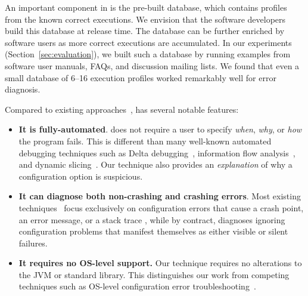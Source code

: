 

An important component in \ourtool is the pre-built
database, which contains profiles
from the known correct executions. We envision that 
the software developers build this database at release time.
The database can be
further enriched by software users as more correct
executions are accumulated. 
In our experiments (Section~\ref{sec:evaluation}), we
built such a database by running examples from software
user manuals, FAQs, and discussion mailing lists.  We
found that even a small database of 6--16 execution profiles worked remarkably
well for error diagnosis.

Compared to existing approaches~\cite{Zeller:2002:ICC, Zhang:2003:PDS,
Rabkin:2011:PPC, Whitaker:2004:CDS, Attariyan:2010:ACT, Wang:2004:AMT}, \ourtool has
several notable features:

\begin{itemize}
\item \textbf{It is fully-automated}.
\ourtool does not require a user to specify
\textit{when}, \textit{why}, or \textit{how} the program fails. This is
different than many well-known automated debugging techniques such
as Delta debugging~\cite{Zeller:2002:ICC}, information flow analysis~\cite{Attariyan:2010:ACT},
 and dynamic slicing~\cite{Zhang:2003:PDS}.
Our technique also provides an \emph{explanation} of
why a configuration option is suspicious. 

\item \textbf{It can diagnose both non-crashing and crashing errors}.
Most existing techniques~\cite{Rabkin:2011:PPC,
Whitaker:2004:CDS, Attariyan:2010:ACT, Su:2007:AIC} focus exclusively on configuration errors
that cause a crash point, an error message, or a stack trace
, while by contract, \ourtool diagnoses
ignoring configuration problems that manifest themselves as
either visible or silent failures.

\item \textbf{It requires no OS-level support.} Our technique requires no alterations to
the JVM or standard library. This distinguishes our work from
competing techniques such as OS-level configuration
error troubleshooting~\cite{Whitaker:2004:CDS, Su:2007:AIC}.%

\end{itemize}

